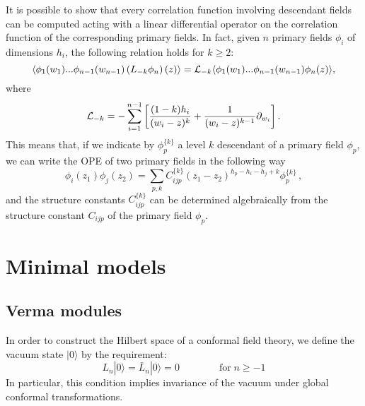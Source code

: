 \documentclass[a4paper,12pt]{report}
\begin{document}
It is possible to show that every correlation function involving descendant fields can be computed acting with a
linear differential operator on the correlation function of the corresponding primary fields. In fact, given $n$
primary fields $\phi_{i}$ of dimensions $h_{i}$, the following relation holds for $k\geq 2$:
\begin{equation}\label{corrdesc}
\langle\phi_{1}(w_{1})...\phi_{n-1}(w_{n-1})\left(L_{-k}\phi_{n}\right)(z)\rangle={\cal
L}_{-k}\langle\phi_{1}(w_{1})...\phi_{n-1}(w_{n-1})\phi_{n}(z)\rangle,
\end{equation}
where
\begin{equation}\label{diffop}
{\cal
L}_{-k}=-\sum_{i=1}^{n-1}\left[\frac{(1-k)h_{i}}{(w_{i}-z)^{k}}+\frac{1}{(w_{i}-z)^{k-1}}\partial_{w_{i}}\right].
\end{equation}
This means that, if we indicate by $\phi_{p}^{\{k\}}$ a level $k$ descendant of a primary field $\phi_{p}$, we can
write the OPE of two primary fields in the following way
\begin{equation}
\phi_{i}(z_{1})\phi_{j}(z_{2})=\sum_{p,k}C_{ijp}^{\{k\}}(z_{1}-z_{2})^{h_{p}-h_{i}-h_{j}+k}\phi_{p}^{\{k\}} \,,
\end{equation}
and the structure constants $C_{ijp}^{\{k\}}$ can be determined algebraically from the structure constant
$C_{ijp}$ of the primary field $\phi_{p}$.

\vspace{1cm}

\section{Minimal models}

\subsection{Verma modules}\label{Verma modules}

In order to construct the Hilbert space of a conformal field theory, we define the vacuum state $|0\rangle$ by
the requirement:
\begin{equation}\label{vacuum}
L_{n}|0\rangle=\bar{L}_{n}|0\rangle=0\qquad\qquad\textrm{for}\;n\geq -1
\end{equation}
In particular, this condition implies invariance of the vacuum under global conformal transformations.
\end{document}
